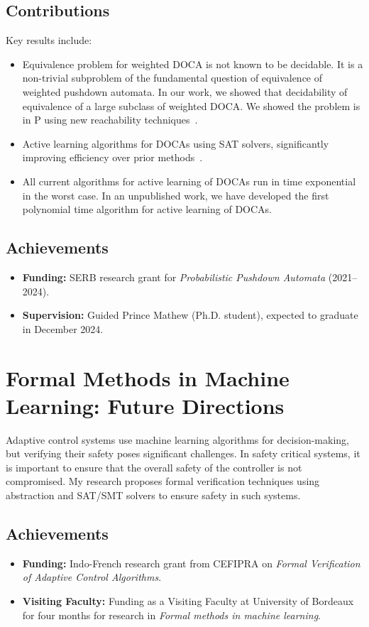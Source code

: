 \documentclass[11pt]{article}
\begin{document}
\subsection{Contributions}
Key results include:
\begin{itemize}
    \item Equivalence problem for weighted DOCA is not known to be decidable. It is a non-trivial subproblem of the fundamental question of equivalence of weighted pushdown automata. In our work, we showed that decidability of equivalence of a large subclass of weighted DOCA. We showed the problem is in P using new reachability techniques~\cite{fsttcs23,icla25}.
    \item Active learning algorithms for DOCAs using SAT solvers, significantly improving efficiency over prior methods~\cite{learning24}.
    \item All current algorithms for active learning of DOCAs run in time exponential in the worst case. In an unpublished work, we have developed the first polynomial time algorithm for active learning of DOCAs.
\end{itemize}

\subsection{Achievements}
\begin{itemize}
    \item \textbf{Funding:} SERB research grant for \emph{Probabilistic Pushdown Automata} (2021--2024).
    \item \textbf{Supervision:} Guided Prince Mathew (Ph.D. student), expected to graduate in December 2024.
\end{itemize}

\section{Formal Methods in Machine Learning: Future Directions}
Adaptive control systems use machine learning algorithms for decision-making, but verifying their safety poses significant challenges. In safety critical systems, it is important
to ensure that the overall safety of the controller is not compromised. My research proposes formal verification techniques using abstraction and SAT/SMT solvers to ensure safety in such systems.

\subsection{Achievements}
\begin{itemize}
    \item \textbf{Funding:} Indo-French research grant from CEFIPRA on \emph{Formal Verification of Adaptive Control Algorithms}.
    \item \textbf{Visiting Faculty:} Funding as a Visiting Faculty at University of Bordeaux for four months for research in \emph{Formal methods in machine learning}.
\end{itemize}
\end{document}

